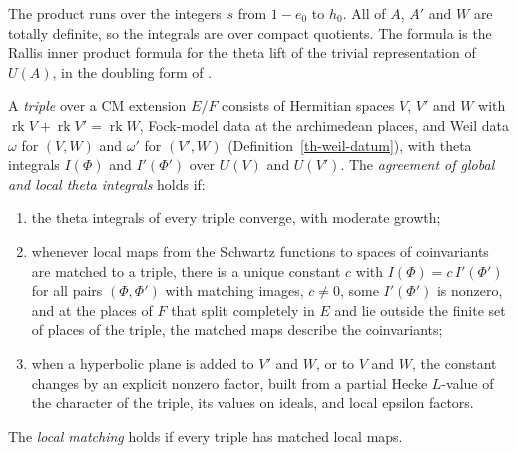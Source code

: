 The product runs over the integers $s$ from $1-e_0$ to $h_0$. All of $A$,
$A'$ and $W$ are totally definite, so the integrals are over compact quotients.
The formula is the Rallis inner product formula \cite{Ral84,Ral87} for the
theta lift of the trivial representation of $U(A)$, in the doubling form of
\cite{HKS96,Yam14,GQT14}.

\begin{definition}\label{th-theta-hypotheses}
A \emph{triple} over a CM extension $E/F$ consists of Hermitian spaces $V$,
$V'$ and $W$ with $\operatorname{rk}V+\operatorname{rk}V'=\operatorname{rk}W$,
Fock-model data at the archimedean places, and Weil data $\omega$ for
$(V,W)$ and $\omega'$ for $(V',W)$ (Definition~\ref{th-weil-datum}), with theta
integrals $I(\Phi)$ and $I'(\Phi')$ over $U(V)$ and $U(V')$. The
\emph{agreement of global and local theta integrals} holds if:
\begin{enumerate}
\item the theta integrals of every triple converge, with moderate growth;
\item whenever local maps from the Schwartz functions to spaces of
  coinvariants are matched to a triple, there is a unique constant $c$ with
  $I(\Phi)=c\,I'(\Phi')$ for all pairs $(\Phi,\Phi')$ with matching images,
  $c\neq0$, some $I'(\Phi')$ is nonzero, and at the places of $F$ that split
  completely in $E$ and lie outside the finite set of places of the triple,
  the matched maps describe the coinvariants;
\item when a hyperbolic plane is added to $V'$ and $W$, or to $V$ and $W$, the
  constant changes by an explicit nonzero factor, built from a partial Hecke
  $L$-value of the character of the triple, its values on ideals, and local
  epsilon factors.
\end{enumerate}
The \emph{local matching} holds if every triple has matched local maps.
\end{definition}

